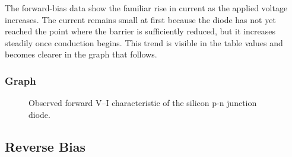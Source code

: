 The forward-bias data show the familiar rise in current as the applied voltage increases.
The current remains small at first because the diode has not yet reached the point where
the barrier is sufficiently reduced, but it increases steadily once conduction begins.
This trend is visible in the table values and becomes clearer in the graph that follows.

\subsubsection*{Graph}
\begin{figure}[H]
  \centering
  \caption{Observed forward V--I characteristic of the silicon p-n junction diode.}
  \label{fig:lab2_observed_forward_vi}
\end{figure}


\subsection{Reverse Bias}

